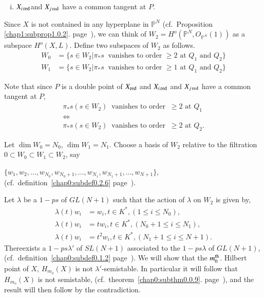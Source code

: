 {\begin{enumerate}[i)]
\item $X_{i \operatorname{red}}$\pageoriginale and $ X_{j \operatorname{red}}$ have a common
  tangent at $P$.  
\end{enumerate}

Since $X$ is  not contained in any hyperplane in $\mathbb{P}^{N}$
(cf.\ Proposition \ref{chap1:subprop1.0.2}. 
page~\pageref{chap1:subprop1.0.2}), we can think of $W_{2} = H^o 
(\mathbb{P}^{N}, O_{\mathbb{P}^{N}} (1))$ as a subspace $H^o (X, L)$.
Define two subspaces of $W_{2}$ as follows.  
\begin{align*}
 W_{0} &  =  \{s \in W_{2} | \pi _{*} s   ~\text{ vanishes to 
   order } \geq 2  \text{ at } Q_{1} \text{ and } Q_{2}\}\\ 
 W_{1} &  =  \{s \in W_{2} | \pi _{*} s   ~\text{ vanishes to
   order }  \geq 1 \text{ at } Q_{1}  \text{ and } Q_{2}\} 
\end{align*}

Note that since $P$ is a double point of $X_{\operatorname{red}}$ and $X_{i \operatorname{red}}$
and  $X_{j \operatorname{red}}$ have a common tangent at $P$,  
\begin{gather*}
\pi_{*}s (s \in W_{2}) ~\text{ vanishes to order }~ \ge 2
\text{ at } Q_{1}\\
\Leftrightarrow\\
\pi_{*}s (s \in W_{2}) ~\text{ vanishes to order }~ \ge 2
\text{ at } Q_{2}.
\end{gather*}

\noindent
Let $\dim W_{0} = N_{0}$, $\dim W_{1} = N_{1}$. Choose a basis of
$W_{2}$ relative to the filtration $0 \subset W_{0} \subset W_{1}
\subset W_{2}$, say  

\noindent
$\{w_{1}, w_{2}, \ldots , w_{N_{0}}, w_{N_{0}+1} ,\ldots ,
    w_{N_{1}}, w_{N_{1}+1}  , \ldots , w_{N+1} \}$, 
(cf.\ definition~\ref{chap0:subdef0.2.6} 
page~\pageref{chap0:subdef0.2.6}).  

Let $\lambda$ be a $1-ps$ of $GL(N+1)$ such that the action of
$\lambda$ on $W_{2}$ is given by,  
\begin{align*}
\lambda (t) w_{i} & = w_{i} , t \in K^{*} ,  (1 \le i \le N_{0}), \\
\lambda (t) w_{i} & = tw_{i} , t \in K^{*} ,  (N_{0} +1 \le i \le N_{1}),\\
\lambda (t) w_{i} & = t^{2}w_{i} , t \in K^{*} ,  (N_{1}+1 \le i \le N+1). 
\end{align*}
There\pageoriginale exists a $1-ps \lambda'$ of $SL(N+1)$ associated
to the $1-ps 
\lambda$ of $GL(N+1)$, (cf.\ definition~\ref{chap0:subdef0.1.2} 
page~\pageref{chap0:subdef0.1.2}). We will 
show that the $m^{\rm th}_{0}$. Hilbert point of $X$, $H_{m_{o}} (X)$ is not
$\lambda'$-semistable. In particular it will follow that
$H_{m_{o}}(X)$ is not semistable, (cf.~theorem~\ref{chap0:subthm0.0.9}. 
page~\pageref{chap0:subthm0.0.9}), and 
the result will then follow by the contradiction.  

}
